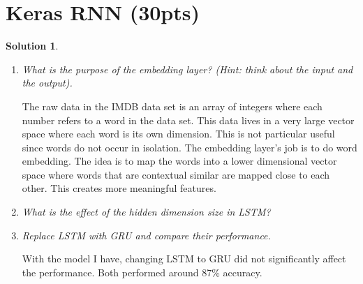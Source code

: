 \documentclass[12pt]{article}
\theoremstyle{definition}
\newtheorem*{solution*}{Solution}
\begin{document}
	\section{Keras RNN (30pts)}
	\begin{solution*}\leavevmode
		\begin{enumerate}[label=\arabic*.,font=\upshape]
			\item \textit{ What is the purpose of the embedding layer? (Hint: think about the input and the output).}
			
			The raw data in the IMDB data set is an array of integers where each number refers to a word in the data set. This data lives in a very large vector space where each word is its own dimension. This is not particular useful since words do not occur in isolation. The embedding layer's job is to do word embedding. The idea is to map the words into a lower dimensional vector space where words that are contextual similar are mapped close to each other. This creates more meaningful features. 
			
			\item \textit{What is the effect of the hidden dimension size in LSTM?}
			
			\item \textit{Replace LSTM with GRU and compare their performance.}
			
			With the model I have, changing LSTM to GRU did not significantly affect the performance. Both performed around 87\% accuracy. 
		\end{enumerate}
	\end{solution*}
\end{document}
